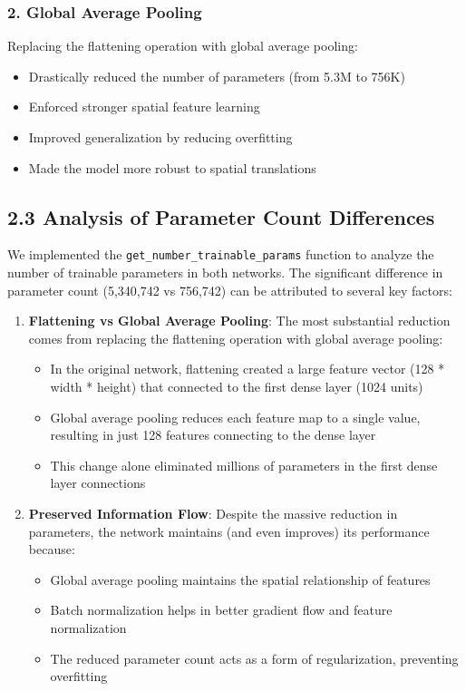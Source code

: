 \subsubsection{2. Global Average Pooling}
Replacing the flattening operation with global average pooling:
\begin{itemize}
    \item Drastically reduced the number of parameters (from 5.3M to 756K)
    \item Enforced stronger spatial feature learning
    \item Improved generalization by reducing overfitting
    \item Made the model more robust to spatial translations
\end{itemize}

\subsection{2.3 Analysis of Parameter Count Differences}

We implemented the \texttt{get\_number\_trainable\_params} function to analyze the number of trainable parameters in both networks. The significant difference in parameter count (5,340,742 vs 756,742) can be attributed to several key factors:

\begin{enumerate}
    \item \textbf{Flattening vs Global Average Pooling}: The most substantial reduction comes from replacing the flattening operation with global average pooling:
    \begin{itemize}
        \item In the original network, flattening created a large feature vector (128 * width * height) that connected to the first dense layer (1024 units)
        \item Global average pooling reduces each feature map to a single value, resulting in just 128 features connecting to the dense layer
        \item This change alone eliminated millions of parameters in the first dense layer connections
    \end{itemize}
    
    \item \textbf{Preserved Information Flow}: Despite the massive reduction in parameters, the network maintains (and even improves) its performance because:
    \begin{itemize}
        \item Global average pooling maintains the spatial relationship of features
        \item Batch normalization helps in better gradient flow and feature normalization
        \item The reduced parameter count acts as a form of regularization, preventing overfitting
    \end{itemize}
\end{enumerate}


